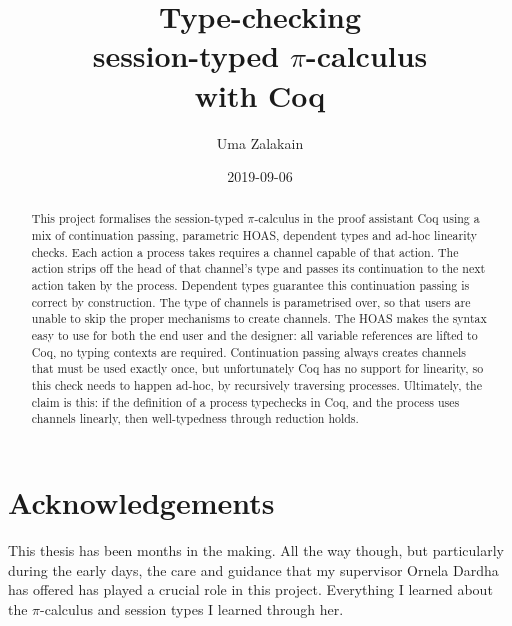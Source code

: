 \documentclass{mproj}
\newcommand{\picalc}{$\pi$-calculus}
\begin{document}
\title{Type-checking\\ session-typed \picalc \\ with Coq}
\author{Uma Zalakain}
\date{2019-09-06}
\maketitle

\begin{abstract}
    This project formalises the session-typed \picalc{} in the proof assistant Coq using a mix of continuation passing, parametric HOAS, dependent types and ad-hoc linearity checks. Each action a process takes requires a channel capable of that action. The action strips off the head of that channel's type and passes its continuation to the next action taken by the process. Dependent types guarantee this continuation passing is correct by construction. The type of channels is parametrised over, so that users are unable to skip the proper mechanisms to create channels. The HOAS makes the syntax easy to use for both the end user and the designer: all variable references are lifted to Coq, no typing contexts are required. Continuation passing always creates channels that must be used exactly once, but unfortunately Coq has no support for linearity, so this check needs to happen ad-hoc, by recursively traversing processes. Ultimately, the claim is this: if the definition of a process typechecks in Coq, and the process uses channels linearly, then well-typedness through reduction holds.
\end{abstract}

\educationalconsent
\vfill{}
\doclicenseThis
\newpage

\section*{Acknowledgements}

This thesis has been months in the making. All the way though, but particularly during the early days, the care and guidance that my supervisor Ornela Dardha has offered has played a crucial role in this project. Everything I learned about the \picalc{} and session types I learned through her.
\end{document}
